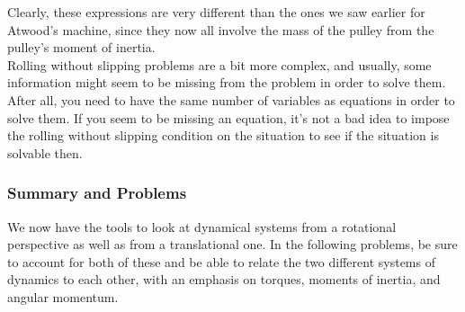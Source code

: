Clearly, these expressions are very different than the ones we saw earlier for Atwood's machine, since they now all involve the mass of the pulley from the pulley's moment of inertia.\\
Rolling without slipping problems are a bit more complex, and usually, some information might seem to be missing from the problem in order to solve them. After all, you need to have the same number of variables as equations in order to solve them. If you seem to be missing an equation, it's not a bad idea to impose the rolling without slipping condition on the situation to see if the situation is solvable then. \\
\subsubsection{Summary and Problems}
We now have the tools to look at dynamical systems from a rotational perspective as well as from a translational one. In the following problems, be sure to account for both of these and be able to relate the two different systems of dynamics to each other, with an emphasis on torques, moments of inertia, and angular momentum. \\

